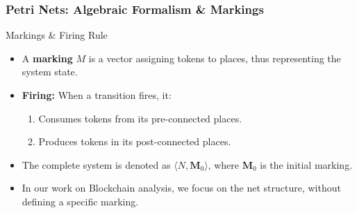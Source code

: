 \documentclass{beamer}
\begin{document}
\begin{frame}
    \frametitle{Petri Nets: Algebraic Formalism \& Markings}

    \begin{block}{Markings \& Firing Rule}
        \begin{itemize}
            \item A \textbf{marking} \(M\) is a vector assigning tokens to places, thus representing the system state.
            \item \textbf{Firing:} When a transition fires, it:
                  \begin{enumerate}
                      \item Consumes tokens from its pre-connected places.
                      \item Produces tokens in its post-connected places.
                  \end{enumerate}
            \item The complete system is denoted as \(\langle N, \mathbf{M}_0 \rangle\), where \(\mathbf{M}_0\) is the initial marking.
            \item In our work on Blockchain analysis, we focus on the net structure, without defining a specific marking.
        \end{itemize}
    \end{block}

\end{frame}
\end{document}
